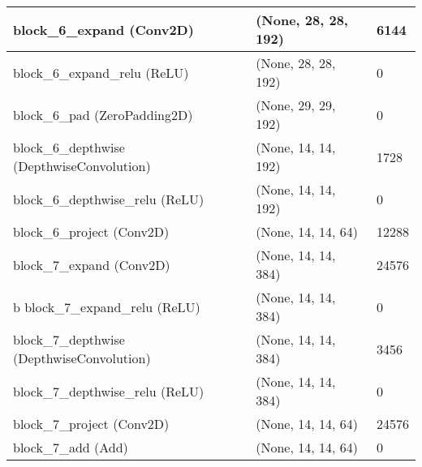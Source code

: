 \documentclass{article}
\begin{document}
\begin{center}
\begin{longtable}[h]{ p{}  p{}  p{}}
block\_6\_expand (Conv2D)                          & (None, 28, 28, 192)  & 6144     \\ \hline
block\_6\_expand\_relu (ReLU)                      & (None, 28, 28, 192)  & 0        \\ \hline
block\_6\_pad (ZeroPadding2D)                      & (None, 29, 29, 192)  & 0        \\ \hline
block\_6\_depthwise (DepthwiseConvolution)         & (None, 14, 14, 192)  & 1728     \\ \hline
block\_6\_depthwise\_relu (ReLU)                   & (None, 14, 14, 192)  & 0        \\ \hline
block\_6\_project (Conv2D)                         & (None, 14, 14, 64)   & 12288    \\ \hline
block\_7\_expand (Conv2D)                          & (None, 14, 14, 384)  & 24576    \\ \hline
b%
block\_7\_expand\_relu (ReLU)                      & (None, 14, 14, 384)  & 0        \\ \hline
block\_7\_depthwise (DepthwiseConvolution)         & (None, 14, 14, 384)  & 3456     \\ \hline
block\_7\_depthwise\_relu (ReLU)                   & (None, 14, 14, 384)  & 0        \\ \hline
block\_7\_project (Conv2D)                         & (None, 14, 14, 64)   & 24576    \\ \hline
block\_7\_add (Add)                                & (None, 14, 14, 64)   & 0        \\ \hline

\end{longtable}
\end{center}
\end{document}
